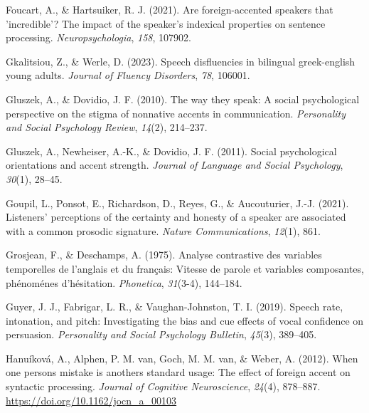 \documentclass[
  man,floatsintext]{apa7}
\newlength{\cslhangindent}
\newlength{\cslentryspacingunit} %
\newenvironment{CSLReferences}[2] %
 {%
  \setlength{\parindent}{0pt}
  \ifodd #1
  \let\oldpar\par
  \def\par{\hangindent=\cslhangindent\oldpar}
  \fi
  \setlength{\parskip}{#2\cslentryspacingunit}
 }%
 {}
\begin{document}
\begin{CSLReferences}{1}{0}
\leavevmode{}%
Foucart, A., \& Hartsuiker, R. J. (2021). Are foreign-accented speakers that 'incredible'? The impact of the speaker's indexical properties on sentence processing. \emph{Neuropsychologia}, \emph{158}, 107902.

\leavevmode{}%
Gkalitsiou, Z., \& Werle, D. (2023). Speech disfluencies in bilingual greek-english young adults. \emph{Journal of Fluency Disorders}, \emph{78}, 106001.

\leavevmode{}%
Gluszek, A., \& Dovidio, J. F. (2010). The way they speak: A social psychological perspective on the stigma of nonnative accents in communication. \emph{Personality and Social Psychology Review}, \emph{14}(2), 214--237.

\leavevmode{}%
Gluszek, A., Newheiser, A.-K., \& Dovidio, J. F. (2011). Social psychological orientations and accent strength. \emph{Journal of Language and Social Psychology}, \emph{30}(1), 28--45.

\leavevmode{}%
Goupil, L., Ponsot, E., Richardson, D., Reyes, G., \& Aucouturier, J.-J. (2021). Listeners' perceptions of the certainty and honesty of a speaker are associated with a common prosodic signature. \emph{Nature Communications}, \emph{12}(1), 861.

\leavevmode{}%
Grosjean, F., \& Deschamps, A. (1975). Analyse contrastive des variables temporelles de l'anglais et du fran{ç}ais: Vitesse de parole et variables composantes, ph{é}nom{é}nes d'h{é}sitation. \emph{Phonetica}, \emph{31}(3-4), 144--184.

\leavevmode{}%
Guyer, J. J., Fabrigar, L. R., \& Vaughan-Johnston, T. I. (2019). Speech rate, intonation, and pitch: Investigating the bias and cue effects of vocal confidence on persuasion. \emph{Personality and Social Psychology Bulletin}, \emph{45}(3), 389--405.

\leavevmode{}%
Hanuíková, A., Alphen, P. M. van, Goch, M. M. van, \& Weber, A. (2012). When one person{\textquotesingle}s mistake is another{\textquotesingle}s standard usage: The effect of foreign accent on syntactic processing. \emph{Journal of Cognitive Neuroscience}, \emph{24}(4), 878--887. \url{https://doi.org/10.1162/jocn_a_00103}


\end{CSLReferences}
\end{document}
